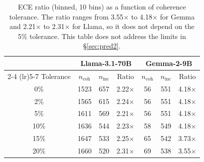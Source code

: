 \begin{table}[h]
\centering
\setlength{\tabcolsep}{4pt}
\begin{tabular}{ccccccc}
\toprule
& \multicolumn{3}{c}{Llama-3.1-70B} & \multicolumn{3}{c}{Gemma-2-9B} \\
\cmidrule(lr){2-4} \cmidrule(lr){5-7}
Tolerance & $n_{\text{coh}}$ & $n_{\text{inc}}$ & Ratio & $n_{\text{coh}}$ & $n_{\text{inc}}$ & Ratio \\
\midrule
0\% & 1523 & 657 & 2.22$\times$ & 56 & 551 & 4.18$\times$ \\
2\% & 1565 & 615 & 2.24$\times$ & 56 & 551 & 4.18$\times$ \\
5\% & 1611 & 569 & 2.21$\times$ & 56 & 551 & 4.18$\times$ \\
10\% & 1636 & 544 & 2.23$\times$ & 58 & 549 & 4.18$\times$ \\
15\% & 1647 & 533 & 2.25$\times$ & 65 & 542 & 3.73$\times$ \\
20\% & 1660 & 520 & 2.31$\times$ & 69 & 538 & 3.55$\times$ \\
\bottomrule
\end{tabular}
\caption{ECE ratio (binned, 10 bins) as a function of coherence tolerance. The ratio ranges from 3.55$\times$ to 4.18$\times$ for Gemma and 2.21$\times$ to 2.31$\times$ for Llama, so it does not depend on the 5\% tolerance. This table does not address the limits in \S\ref{sec:pred2}.}
\label{tab:pred2-robustness}
\end{table}
